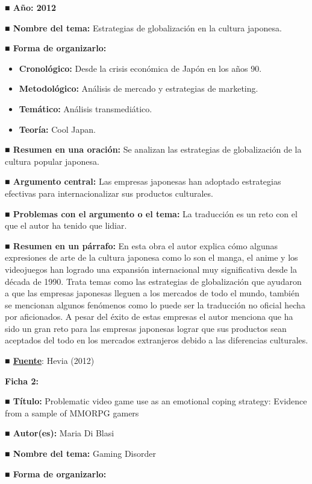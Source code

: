 \documentclass[
  letterpaper,
  DIV=11,
  numbers=noendperiod]{scrreprt}
\begin{document}
\textbf{■ Año: 2012}

\textbf{■ Nombre del tema:} Estrategias de globalización en la cultura
japonesa.

\textbf{■ Forma de organizarlo:}

\begin{itemize}
\item
  \textbf{Cronológico:} Desde la crisis económica de Japón en los años
  90.
\item
  \textbf{Metodológico:} Análisis de mercado y estrategias de marketing.
\item
  \textbf{Temático:} Análisis transmediático.
\item
  \textbf{Teoría:} Cool Japan.
\end{itemize}

\textbf{■ Resumen en una oración:} Se analizan las estrategias de
globalización de la cultura popular japonesa.

\textbf{■ Argumento central:} Las empresas japonesas han adoptado
estrategias efectivas para internacionalizar sus productos culturales.

\textbf{■ Problemas con el argumento o el tema:} La traducción es un
reto con el que el autor ha tenido que lidiar.

\textbf{■ Resumen en un párrafo:} En esta obra el autor explica cómo
algunas expresiones de arte de la cultura japonesa como lo son el manga,
el anime y los videojuegos han logrado una expansión internacional muy
significativa desde la década de 1990. Trata temas como las estrategias
de globalización que ayudaron a que las empresas japonesas lleguen a los
mercados de todo el mundo, también se mencionan algunos fenómenos como
lo puede ser la traducción no oficial hecha por aficionados. A pesar del
éxito de estas empresas el autor menciona que ha sido un gran reto para
las empresas japonesas lograr que sus productos sean aceptados del todo
en los mercados extranjeros debido a las diferencias culturales.

\textbf{■
\href{https://funderetica.org/wp-content/uploads/2017/01/Cuaderno-7-web-def.pdf}{Fuente}}:
Hevia (2012)

\textbf{Ficha 2:}

\textbf{■ Título:} Problematic video game use as an emotional coping
strategy: Evidence from a sample of MMORPG gamers

\textbf{■ Autor(es):} Maria Di Blasi

\textbf{■ Nombre del tema:} Gaming Disorder

\textbf{■ Forma de organizarlo:}
\end{document}

